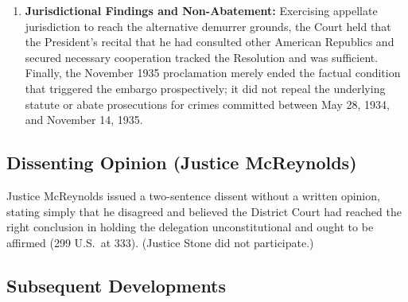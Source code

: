 \documentclass[12pt]{article}
\begin{document}
\begin{enumerate}
  \item \textbf{Jurisdictional Findings and Non-Abatement:} Exercising appellate jurisdiction to reach the alternative demurrer grounds, the Court held that the President's recital that he had consulted other American Republics and secured necessary cooperation tracked the Resolution and was sufficient. Finally, the November 1935 proclamation merely ended the factual condition that triggered the embargo prospectively; it did not repeal the underlying statute or abate prosecutions for crimes committed between May 28, 1934, and November 14, 1935.
\end{enumerate}

\subsection{Dissenting Opinion (Justice McReynolds)}

Justice McReynolds issued a two-sentence dissent without a written opinion, stating simply that he disagreed and believed the District Court had reached the right conclusion in holding the delegation unconstitutional and ought to be affirmed (299 U.S.\ at 333). (Justice Stone did not participate.)

\subsection{Subsequent Developments}
\end{document}
